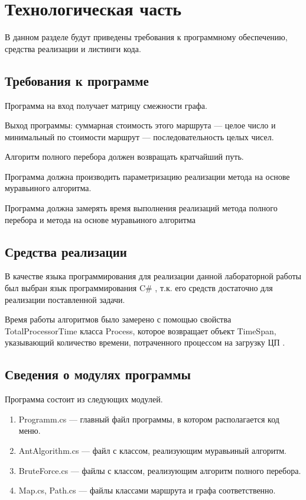 \chapter{Технологическая часть}

В данном разделе будут приведены требования к программному обеспечению, средства реализации и листинги кода.

\section{Требования к программе}

Программа на вход получает матрицу смежности графа.

Выход программы: суммарная стоимость этого маршрута --- целое число и минимальный по стоимости маршрут --- последовательность целых чисел.

Алгоритм полного перебора должен возвращать кратчайший путь.

Программа должна производить параметризацию реализации метода на основе муравьиного алгоритма.

Программа должна замерять время выполнения реализаций метода полного перебора и метода на основе муравьиного алгоритма

\section{Средства реализации}

В качестве языка программирования для реализации данной лабораторной работы был выбран язык программирования C\# \cite{sharplang}, т.к. его средств достаточно для реализации поставленной задачи.

Время работы алгоритмов было замерено с помощью свойства \\TotalProcessorTime класса Process, которое возвращает объект TimeSpan, указывающий количество времени, потраченного процессом на загрузку ЦП \cite{cpplangtime}.

\section{Сведения о модулях программы}
Программа состоит из следующих модулей.
\begin{enumerate}
	\item Programm.cs --- главный файл программы, в котором располагается код меню.
	\item AntAlgorithm.cs --- файл с классом, реализующим муравьиный алгоритм.
	\item BruteForce.cs  --- файлы с классом, реализующим алгоритм полного перебора.
	\item Map.cs, Path.cs --- файлы классами маршрута и графа соответственно.
\end{enumerate}


